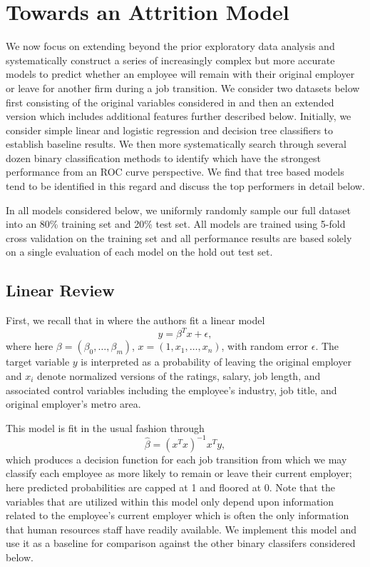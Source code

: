 \documentclass[10pt]{article}
\begin{document}
\section{Towards an Attrition Model}\label{modsec}

We now focus on extending beyond the prior exploratory data analysis and systematically construct 
a series of increasingly complex but more accurate 
models to predict whether an employee will remain with their original employer or 
leave for another firm during a job transition.  We consider two datasets below first 
consisting of the original variables considered in \cite{Smart2016} and then an extended 
version which includes additional features further described below. Initially, we 
consider simple linear and logistic regression and decision tree classifiers to establish 
baseline results.  We then more systematically search through several dozen binary classification 
methods to identify which have the strongest performance from an ROC curve perspective.  We find 
that tree based models tend to be identified in this regard and discuss the top performers 
in detail below. 

In all models considered below, we uniformly randomly sample our full dataset into an 80\% training set 
and 20\% test set.  All models are trained using 5-fold cross validation on the training set and all performance 
results are based solely on a single evaluation of each model on the hold out test set.  

\subsection{Linear Review}
First, we recall that in \cite{Smart2016} where the authors fit a linear model 
%
\begin{equation} 
    y = \beta^Tx + \epsilon, 
\end{equation} 
% 
where here $\beta = (\beta_0,\ldots,\beta_m)$, $x=(1,x_1,\ldots,x_{n})$, with random 
error $\epsilon$. The 
target variable $y$ is interpreted as a probability of leaving the original employer and 
$x_i$ denote normalized versions of the ratings, salary, job length, and 
associated control variables including the employee's industry, job title, and original 
employer's metro area.

This model is fit in the usual fashion through 
%
\begin{equation}
    \hat{\beta} = (x^Tx)^{-1}x^Ty,
\end{equation}
%
which produces a decision function for each job transition from which we may classify 
each employee as more likely to remain or leave their current employer; here predicted probabilities 
are capped at 1 and floored at 0. Note that the variables 
that are utilized within this model only depend upon information related to the employee's 
current employer which is often the only information that human resources staff have 
readily available.  We implement this model and use it as a baseline for comparison against the other
binary classifers considered below. 
\end{document}
